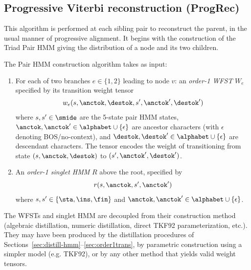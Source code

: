 
\subsection{Progressive Viterbi reconstruction (ProgRec)}

This algorithm is performed at each sibling pair to reconstruct the parent, in the usual manner of progressive alignment.
It begins with the construction of the Triad Pair HMM giving the distribution of a node and its two children.

The Pair HMM construction algorithm takes as input:
\begin{enumerate}
\item For each of two branches $e \in \{ 1, 2 \}$ leading to node $v$:
  an \emph{order-1 WFST} $W_e$ specified by its transition weight tensor
  \begin{equation}
  w_e(s, \anctok, \destok, s', \anctok', \destok')
  \label{eq:wfst-tensor}
  \end{equation}
  where $s, s' \in \smide$ are the 5-state pair HMM states,
  $\anctok, \anctok' \in \alphabet \cup \{\epsilon\}$ are ancestor characters
  (with $\epsilon$ denoting BOS/no-context),
  and $\destok, \destok' \in \alphabet \cup \{\epsilon\}$ are descendant characters.
  The tensor encodes the weight of transitioning from state $(s, \anctok, \destok)$
  to $(s', \anctok', \destok')$.

\item An \emph{order-1 singlet HMM} $R$ above the root, specified by
  \begin{equation}
  r(s, \anctok, s', \anctok')
  \label{eq:singlet-tensor}
  \end{equation}
  where $s, s' \in \{\sta, \ins, \fin\}$ and $\anctok, \anctok' \in \alphabet \cup \{\epsilon\}$.
\end{enumerate}

The WFSTs and singlet HMM are decoupled from their construction method
(algebraic distillation, numeric distillation, direct TKF92 parameterization, etc.).
They may have been produced by the distillation procedures of
Sections~\ref{sec:distill-hmm}--\ref{sec:order1trans},
by parametric construction using a simpler model (e.g. TKF92),
or by any other method that yields valid weight tensors.

